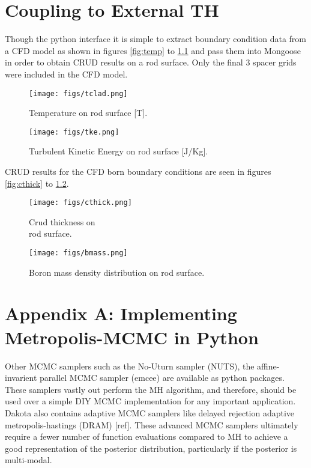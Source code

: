 \documentclass[10pt,a4paper]{report}
\begin{document}
\chapter{Coupling to External TH}

Though the python interface it is simple to extract boundary condition data from a CFD model as shown in figures \ref{fig:temp} to \ref{fig:tke} and pass them into Mongoose in order to obtain CRUD results on a rod surface.  Only the final 3 spacer grids were included in the CFD model.

\begin{figure}
    \centering
    \begin{minipage}{.5\textwidth}
        \centering
        \texttt{[image: figs/tclad.png]}
        \caption{Temperature on rod surface [T]. \label{fig:temp}}
    \end{minipage}%
    \begin{minipage}{.5\textwidth}
        \centering
        \texttt{[image: figs/tke.png]}
        \caption{Turbulent Kinetic Energy on rod surface [J/Kg]. \label{fig:tke}}
    \end{minipage}
\end{figure}
CRUD results for the CFD born boundary conditions are seen in figures \ref{fig:cthick} to \ref{fig:bmass}.
\begin{figure}
    \centering
    \begin{minipage}{.5\textwidth}
        \centering
        \texttt{[image: figs/cthick.png]}
        \caption{Crud thickness on \\
        rod surface. \label{fig:cthick}}
    \end{minipage}%
    \begin{minipage}{.5\textwidth}
        \centering
        \texttt{[image: figs/bmass.png]}
        \caption{Boron mass density distribution on rod surface. \label{fig:bmass}}
    \end{minipage}
\end{figure}


\chapter{Appendix A: Implementing Metropolis-MCMC in Python}

Other MCMC samplers such as the No-Uturn sampler (NUTS), the affine-invarient parallel MCMC sampler (emcee) are available as python packages.  These samplers vastly out perform the MH algorithm, and therefore, should be used over a simple DIY MCMC implementation for any important application.  Dakota also contains adaptive MCMC samplers like delayed rejection adaptive metropolis-hastings (DRAM) [ref].  These advanced MCMC samplers ultimately require a fewer number of function evaluations compared to MH to achieve a good representation of the posterior distribution, particularly if the posterior is multi-modal.
\end{document}
